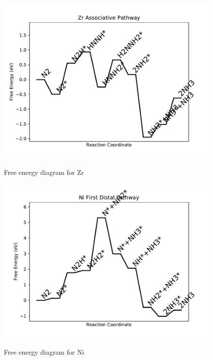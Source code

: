 \documentclass[journal=jacsat,manuscript=article]{achemso}
\begin{document}
\begin{figure}
\includegraphics[width=1\linewidth]{data/plots/Zr_associative.pdf}
\label{fig:Zr_associative}
\caption{Free energy diagram for Zr}
\end{figure}

\newpage
\begin{figure}
\includegraphics[width=1\linewidth]{data/plots/Ni_distal_1.pdf}
\label{fig:Ni_distal_1}
\caption{Free energy diagram for Ni}
\end{figure}
\end{document}

